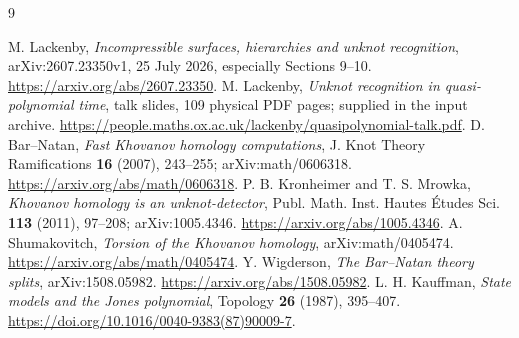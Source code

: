 \documentclass[11pt]{article}
\theoremstyle{definition}\newtheorem{definition}[theorem]{Definition}
\theoremstyle{remark}\newtheorem{remark}[theorem]{Remark}
\begin{document}
\clearpage
\begin{thebibliography}{9}
\raggedright
{}
M. Lackenby, \emph{Incompressible surfaces, hierarchies and unknot recognition},
arXiv:2607.23350v1, 25 July 2026, especially Sections 9--10.
\url{https://arxiv.org/abs/2607.23350}.
M. Lackenby, \emph{Unknot recognition in quasi-polynomial time},
talk slides, 109 physical PDF pages; supplied in the input archive.
\url{https://people.maths.ox.ac.uk/lackenby/quasipolynomial-talk.pdf}.
D. Bar--Natan, \emph{Fast Khovanov homology computations},
J. Knot Theory Ramifications \textbf{16} (2007), 243--255;
arXiv:math/0606318. \url{https://arxiv.org/abs/math/0606318}.
P. B. Kronheimer and T. S. Mrowka, \emph{Khovanov homology is an
unknot-detector}, Publ. Math. Inst. Hautes \'Etudes Sci. \textbf{113} (2011),
97--208; arXiv:1005.4346. \url{https://arxiv.org/abs/1005.4346}.
A. Shumakovitch, \emph{Torsion of the Khovanov homology},
arXiv:math/0405474. \url{https://arxiv.org/abs/math/0405474}.
Y. Wigderson, \emph{The Bar--Natan theory splits}, arXiv:1508.05982.
\url{https://arxiv.org/abs/1508.05982}.
L. H. Kauffman, \emph{State models and the Jones polynomial},
Topology \textbf{26} (1987), 395--407.
\url{https://doi.org/10.1016/0040-9383(87)90009-7}.
\end{thebibliography}
\end{document}
